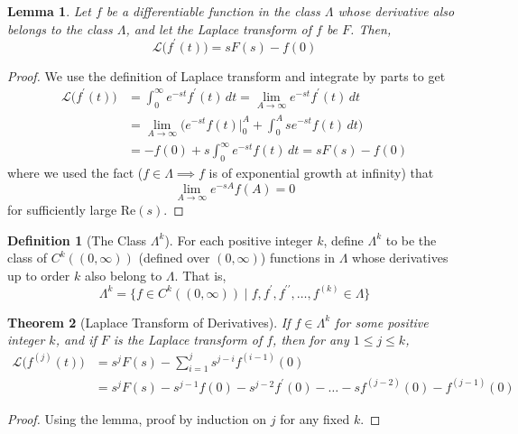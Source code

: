 \documentclass{article}
\newtheorem{theorem}{Theorem}[section]
\newtheorem{lemma}[theorem]{Lemma}
\theoremstyle{remark}
\theoremstyle{definition}
\newtheorem{definition}{Definition}[section]
\begin{document}
      \begin{lemma}
      Let $f$ be a differentiable function in the class $\Lambda$ whose derivative also belongs to the class $\Lambda$, and let the Laplace transform of $f$ be $F$. Then, 
      \[\mathcal{L} \big( f^\prime (t) \big) = s F(s) - f(0) \]
      \end{lemma}
      \begin{proof}
      We use the definition of Laplace transform and integrate by parts to get 
      \begin{align*}
          \mathcal{L}\big( f^\prime (t) \big) & = \int_0^\infty e^{-st} f^\prime (t) \,dt = \lim_{A \rightarrow \infty} e^{-st} f^\prime (t) \,dt \\
          & = \lim_{A\rightarrow \infty} \bigg( e^{-st} f(t) \big|_0^A + \int_0^A s e^{-st} f(t)\,dt\bigg) \\
          & = - f(0) + s\int_0^\infty e^{-st} f(t) \,dt = s F(s) - f(0)
      \end{align*}
      where we used the fact ($f \in \Lambda \implies f$ is of exponential growth at infinity) that 
      \[\lim_{A \rightarrow \infty} e^{-sA} f(A) = 0\]
      for sufficiently large Re$(s)$. 
      \end{proof}

      \begin{definition}[The Class $\Lambda^k$]
      For each positive integer $k$, define $\Lambda^k$ to be the class of $C^k((0, \infty))$ (defined over $(0, \infty)$) functions in $\Lambda$ whose derivatives up to order $k$ also belong to $\Lambda$. That is, 
      \[\Lambda^k = \{f \in C^k((0, \infty))\;|\; f, f^\prime, f^{\prime\prime}, \ldots, f^{(k)} \in \Lambda \}\]
      \end{definition}

      \begin{theorem}[Laplace Transform of Derivatives]
      If $f \in \Lambda^k$ for some positive integer $k$, and if $F$ is the Laplace transform of $f$, then for any $1 \leq j \leq k$, 
      \begin{align*}
          \mathcal{L}\big( f^{(j)} (t) \big) & = s^j F(s) - \sum_{i=1}^j s^{j-i} f^{(i-1)}(0) \\
          & = s^j F(s) - s^{j-1} f(0) - s^{j-2} f^\prime (0) - \ldots - s f^{(j-2)}(0) - f^{(j-1)} (0)
      \end{align*}
      \end{theorem}
      \begin{proof}
      Using the lemma, proof by induction on $j$ for any fixed $k$. 
      \end{proof}
\end{document}
